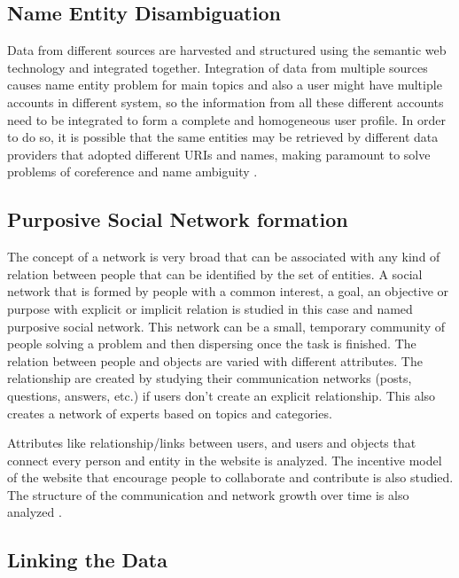 \subsection{Name Entity Disambiguation}

Data from different sources are harvested and structured using the semantic web technology and integrated together. Integration of data from multiple sources causes name entity problem for main topics and also a user might have multiple accounts in different system, so the information from all these different accounts need to be integrated to form a complete and homogeneous user profile. In order to do so, it is possible that the same entities may be retrieved by different data providers that adopted different URIs and names, making paramount to solve problems of coreference and name ambiguity \cite{glaser2007coreference}.

\subsection{Purposive Social Network formation}

The concept of a network is very broad that can be associated with any kind of relation between people that can be identified by the set of entities. A social network that is formed by people with a common interest, a goal, an objective or purpose with explicit or implicit relation is studied in this case and named purposive social network. This network can be a small, temporary community of people solving a problem and then dispersing once the task is finished. The relation between people and objects are varied with different attributes. The relationship are created by studying their communication networks (posts, questions, answers, etc.) if users don't create an explicit relationship. This also creates a network of experts based on topics and categories.

Attributes like relationship/links between users, and users and objects that connect every person and entity in the website is analyzed. The incentive model of the website that encourage people to collaborate and contribute is also studied. The structure of the communication and network growth over time is also analyzed \cite{mika2005flink}.



\subsection{Linking the Data}


